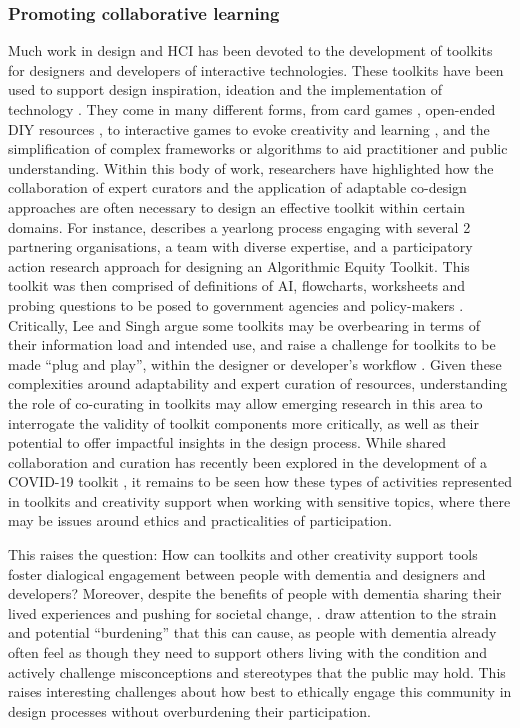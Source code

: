 \subsubsection{Promoting collaborative learning}
\label{BL:chapter7Overview}
Much work in design and HCI has been devoted to the development of toolkits for designers and developers of interactive technologies. These toolkits have been used to support design inspiration, ideation and the implementation of technology \citep{broderick2020theory,jarusriboonchai2018thinking,ledo2018evaluation}. They come in many different forms, from card games \citep{peters2020toolkits,logler2018metaphor,alshehri2020scenario}, open-ended DIY resources  \citep{meissner2018schnittmuster}, to interactive games to evoke creativity and learning \citep{ellis2021tapeblocks}, and the simplification of complex frameworks or algorithms to aid practitioner and public understanding\citep{srinivasan2012cultural}. Within this body of work, researchers have highlighted how the collaboration of expert curators and the application of adaptable co-design approaches are often necessary to design an effective toolkit within certain domains. For instance, \cite{krafft2021action} describes a yearlong process engaging with several 2 partnering organisations, a team with diverse expertise, and a participatory action research approach for designing an Algorithmic Equity Toolkit. This toolkit was then comprised of definitions of AI, flowcharts, worksheets and probing questions to be posed to government agencies and policy-makers \citep{katell2020toward}. Critically, Lee and Singh argue some toolkits may be overbearing in terms of their information load and intended use, and raise a challenge for toolkits to be made “plug and play”, within the designer or developer’s workflow \citep{lee2021landscape}. Given these complexities around adaptability and expert curation of resources, understanding the role of co-curating in toolkits may allow emerging research in this area to interrogate the validity of toolkit components more critically, as well as their potential to offer impactful insights in the design process. While shared collaboration and curation has recently been explored in the development of a COVID-19 toolkit \citep{braybrooke2020together}, it remains to be seen how these types of activities represented in toolkits and creativity support when working with sensitive topics, where there may be issues around ethics and practicalities of participation.

This raises the question: How can toolkits and other creativity support tools foster dialogical engagement between people with dementia and designers and developers? Moreover, despite the benefits of people with dementia sharing their lived experiences and pushing for societal change, \cite{johnson_older_2019}. draw attention to the strain and potential “burdening” that this can cause, as people with dementia already often feel as though they need to support others living with the condition and actively challenge misconceptions and stereotypes that the public may hold. This raises interesting challenges about how best to ethically engage this community in design processes without overburdening their participation.

